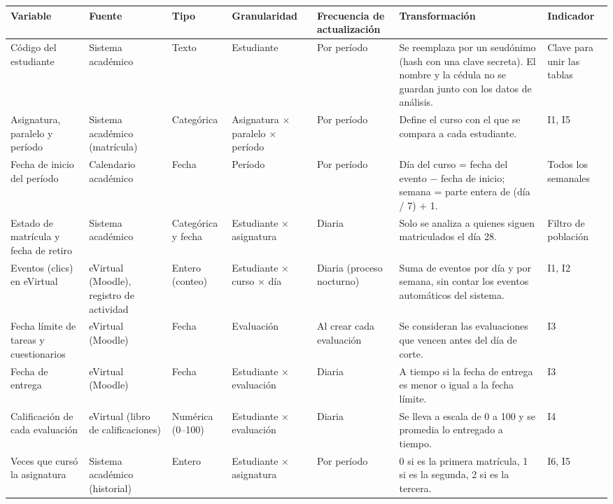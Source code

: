 \documentclass[10pt]{article}
\begin{document}
{\footnotesize
\begin{longtable}{P{3.2cm} P{3.4cm} P{2.3cm} P{2.8cm} P{2.6cm} P{6.2cm} P{3.0cm}}
\toprule
\textbf{Variable} & \textbf{Fuente} & \textbf{Tipo} & \textbf{Granularidad} & \textbf{Frecuencia de actualización} & \textbf{Transformación} & \textbf{Indicador}\\
\midrule
\endhead
\bottomrule
\endfoot
Código del estudiante & Sistema académico & Texto & Estudiante & Por período & Se reemplaza por un seudónimo (hash con una clave secreta). El nombre y la cédula no se guardan junto con los datos de análisis. & Clave para unir las tablas\\
Asignatura, paralelo y período & Sistema académico (matrícula) & Categórica & Asignatura $\times$ paralelo $\times$ período & Por período & Define el curso con el que se compara a cada estudiante. & I1, I5\\
Fecha de inicio del período & Calendario académico & Fecha & Período & Por período & Día del curso = fecha del evento $-$ fecha de inicio; semana = parte entera de (día / 7) + 1. & Todos los semanales\\
Estado de matrícula y fecha de retiro & Sistema académico & Categórica y fecha & Estudiante $\times$ asignatura & Diaria & Solo se analiza a quienes siguen matriculados el día 28. & Filtro de población\\
Eventos (clics) en eVirtual & eVirtual (Moodle), registro de actividad & Entero (conteo) & Estudiante $\times$ curso $\times$ día & Diaria (proceso nocturno) & Suma de eventos por día y por semana, sin contar los eventos automáticos del sistema. & I1, I2\\
Fecha límite de tareas y cuestionarios & eVirtual (Moodle) & Fecha & Evaluación & Al crear cada evaluación & Se consideran las evaluaciones que vencen antes del día de corte. & I3\\
Fecha de entrega & eVirtual (Moodle) & Fecha & Estudiante $\times$ evaluación & Diaria & A tiempo si la fecha de entrega es menor o igual a la fecha límite. & I3\\
Calificación de cada evaluación & eVirtual (libro de calificaciones) & Numérica (0--100) & Estudiante $\times$ evaluación & Diaria & Se lleva a escala de 0 a 100 y se promedia lo entregado a tiempo. & I4\\
Veces que cursó la asignatura & Sistema académico (historial) & Entero & Estudiante $\times$ asignatura & Por período & 0 si es la primera matrícula, 1 si es la segunda, 2 si es la tercera. & I6, I5\\

\end{longtable}}
\end{document}
